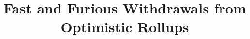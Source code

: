\documentclass[runningheads]{llncs}
\begin{document}
\title{\Large \bf Fast and Furious Withdrawals from Optimistic Rollups}

\author{}

\institute{}

\maketitle














\clearpage
\appendix
\end{document}
